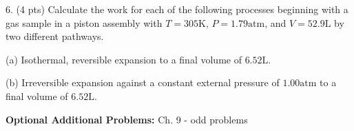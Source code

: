 \documentclass[11pt]{article}
\begin{document}
\vspace{1in}

6. (4 pts) Calculate the work for each of the following processes beginning with a gas
sample in a piston assembly with $T=305\text{K}$, $P=1.79\text{atm}$, and
$V=52.9\text{L}$ by two different pathways.

(a) Isothermal, reversible expansion to a final volume of $6.52\text{L}$.

(b) Irreversible expansion against a constant external pressure of $1.00\text{atm}$
to a final volume of $6.52\text{L}$.

\vspace{1.5in}


\vfill
\textbf{Optional Additional Problems:} Ch. 9 - odd problems 
\end{document}
